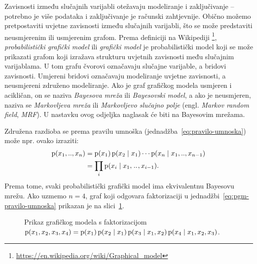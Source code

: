 \documentclass[utf8, diplomski, lmodern]{fer}
\begin{document}
Zavisnosti između slučajnih varijabli otežavaju modeliranje i zaključivanje -- potrebno je više podataka i zaključivanje je računski zahtjevnije. Obično možemo pretpostaviti uvjetne zavisnosti između slučajnih varijabli, što se može predstaviti neusmjerenim ili usmjerenim grafom. Prema definiciji na Wikipediji \footnote{\url{https://en.wikipedia.org/wiki/Graphical_model}}, \emph{probabilistički grafički model} ili \emph{grafički model} je probabilistički model koji se može prikazati grafom koji izražava strukturu uvjetnih zavisnosti među slučajnim varijablama. U tom grafu čvorovi označavaju slučajne varijable, a bridovi zavisnosti. Umjereni bridovi označavaju modeliranje uvjetne zavisnosti, a neusmjereni združeno modeliranje. Ako je graf grafičkog modela usmjeren i acikličan, on se naziva \emph{Bayesova mreža} ili \emph{Bayesovski model}, a ako je neusmjeren, naziva se \emph{Markovljeva mreža} ili \emph{Markovljevo slučajno polje} (engl. \textit{Markov random field}, \textit{MRF}). U nastavku ovog odjeljka naglasak će biti na Bayesovim mrežama.

Združena razdioba se prema pravilu umnoška (jednadžba~\eqref{eq:pravilo-umnoska}) može npr. ovako izraziti:
\begin{align}
\operatorname*{\mathrm{p}}(x_1,..,x_n) 
&= \operatorname*{\mathrm{p}}(x_1)\operatorname*{\mathrm{p}}(x_2\mid x_1)\cdots\operatorname*{\mathrm{p}}(x_n\mid x_1,..,x_{n-1}) \\
&= \prod_i\operatorname*{\mathrm{p}}(x_i\mid x_1,\mkern1.5mu{..}\mkern1.5mu,x_{i-1}) \text{.}
\label{eq:pgm-pravilo-umnoska}
\end{align} 
Prema tome, svaki probabilistički grafički model ima ekvivalentnu Bayesovu mrežu. Ako uzmemo $n=4$, graf koji odgovara faktorizaciji u jednadžbi~\eqref{eq:pgm-pravilo-umnoska} prikazan je na slici~\ref{fig:bayesova-mreza}.

\begin{figure}
	\centering
	\caption{Prikaz grafičkog modela s faktorizacijom $\operatorname*{\mathrm{p}}(x_1,x_2,x_3,x_4)=\operatorname*{\mathrm{p}}(x_1)\operatorname*{\mathrm{p}}(x_2\mid x_1)\operatorname*{\mathrm{p}}(x_3\mid x_1,x_2)\operatorname*{\mathrm{p}}(x_4\mid x_1,x_2,x_3)$.}
	\label{fig:bayesova-mreza}
\end{figure}
\end{document}
